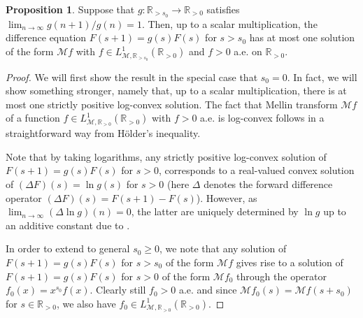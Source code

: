 \documentclass[a4paper,12pt,oneside]{article}
\theoremstyle{definition}
\newtheorem{prop}[defi]{Proposition}
\newcommand{\R}{\mathbb{R}}
\newcommand{\MT}[1]{\mathcal{M}#1}
\begin{document}
\begin{prop} \label{MT_DE_uni}
    Suppose that $g:\R_{>s_0}\to\R_{>0}$ satisfies $\lim_{n\to\infty} g(n+1)/g(n)=1$. Then, up to a scalar multiplication, the difference equation $F(s+1)=g(s)F(s)$ for $s>s_0$ has at most one solution of the form $\MT{f}$ with $f\in L_{\MT{},\R_{>s_0}}^{1}(\R_{>0})$ and $f>0$ a.e. on $\R_{>0}$.
\end{prop}
\begin{proof}
    We will first show the result in the special case that $s_0=0$. In fact, we will show something stronger, namely that, up to a scalar multiplication, there is at most one strictly positive log-convex solution. The fact that Mellin transform $\MT{f}$ of a function $f\in L_{\MT{},\R_{>0}}^{1}(\R_{>0})$ with $f>0$ a.e. is log-convex follows in a straightforward way from Hölder's inequality. 

    Note that by taking logarithms, any strictly positive log-convex solution of $F(s+1)=g(s)F(s)$ for $s>0$, corresponds to a real-valued convex solution of $(\Delta F)(s) = \ln g(s) $ for $s>0$ (here $\Delta$ denotes the forward difference operator $(\Delta F)(s)=F(s+1)-F(s)$). However, as $\lim_{n\to\infty} (\Delta \ln g)(n) = 0 $, the latter are uniquely determined by $\ln g$ up to an additive constant due to \cite[Thm. 1.4]{MZ:B-M}.
   
    In order to extend to general $s_0\geq 0$, we note that any solution of $F(s+1)=g(s)F(s)$ for $s>s_0$ of the form $\MT{f}$ gives rise to a solution of $F(s+1)=g(s)F(s)$ for $s>0$ of the form $\MT{f_0}$ through the operator $f_0(x) = x^{s_0} f(x)$. Clearly still $f_0>0$ a.e. and since $\MT{f_0}(s) = \MT{f}(s+s_0)$ for $s\in\R_{>0}$, we also have $f_0\in L_{\MT{},\R_{>0}}^{1}(\R_{>0})$.
\end{proof}
\end{document}
